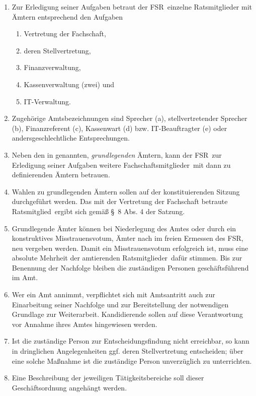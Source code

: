 \documentclass[a4paper, 12pt, ngerman]{article}
\newcommand{\rat}{FSR}
\newcommand{\rates}{FSR}
\newcommand{\mitglieder}{Ratsmitglieder}
\newcommand{\mitglied}{Ratsmitglied}
\newcommand{\fsmitglieder}{Fachschaftsmitglieder}
\begin{document}
\begin{enumerate}[leftmargin=0cm]
	\begin{enumerate}[leftmargin=0cm]
		\item Zur Erledigung seiner Aufgaben betraut der \rat~einzelne Ratsmitglieder mit Ämtern entsprechend den Aufgaben\label{Amter.grundl}
			\begin{enumerate}[leftmargin=0.5cm]
				\item Vertretung der Fachschaft,
				\item deren Stellvertretung,
				\item Finanzverwaltung,
				\item Kassenverwaltung (zwei) und
				\item IT-Verwaltung.\label{Amt:IT}
			\end{enumerate}
		\item Zugehörige Amtsbezeichnungen sind Sprecher (a), stellvertretender Sprecher (b), Finanzreferent (c), Kassenwart (d) bzw. IT-Beauftragter (e) oder andersgeschlechtliche Entsprechungen.
		\item Neben den in  genannten, \textit{grundlegenden} Ämtern, kann der \rat~zur Erledigung seiner Aufgaben weitere 
		\fsmitglieder~mit dann zu definierenden Ämtern betrauen.\label{weitereAmter}
		\item Wahlen zu grundlegenden Ämtern sollen auf der konstituierenden Sitzung durchgeführt werden. Das mit der Vertretung der Fachschaft betraute \mitglied~ergibt sich gemäß §~8 Abs. 4 der Satzung.\label{amtswahlzeit}
		\item Grundlegende Ämter können bei Niederlegung des Amtes oder durch ein konstruktives Misstrauensvotum, Ämter nach  im freien Ermessen des \rates, neu vergeben werden. Damit ein Misstrauensvotum erfolgreich ist,  muss eine absolute Mehrheit der amtierenden \mitglieder~dafür stimmen.
        Bis zur Benennung der Nachfolge bleiben die zuständigen Personen geschäftsführend im Amt.
		\item Wer ein Amt annimmt, verpflichtet sich mit Amtsantritt auch zur Einarbeitung seiner Nachfolge und zur Bereitstellung der notwendigen Grundlage zur Weiterarbeit. Kandidierende sollen auf diese Verantwortung vor Annahme ihres Amtes hingewiesen werden.
		\item Ist die zuständige Person zur Entscheidungsfindung nicht erreichbar, so kann in dringlichen Angelegenheiten ggf. deren Stellvertretung entscheiden; über eine solche Maßnahme ist die zuständige Person unverzüglich zu unterrichten.
		\item Eine Beschreibung der jeweiligen Tätigkeitsbereiche soll dieser Geschäftsordnung angehängt werden.
	\end{enumerate}


\end{enumerate}
\end{document}
